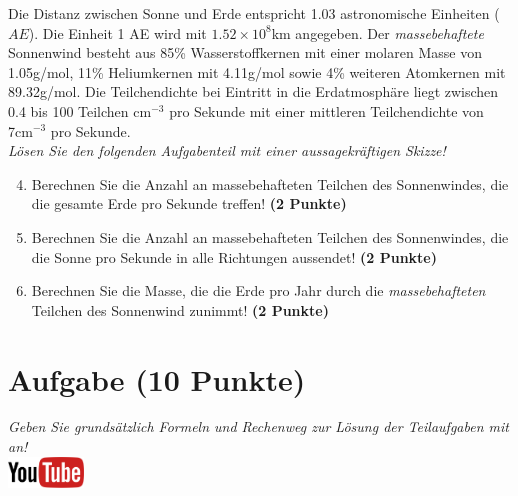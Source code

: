 \documentclass[a4paper, 9pt]{scrartcl}\usepackage[]{graphicx}\usepackage[]{xcolor}
\begin{document}
Die Distanz zwischen Sonne und Erde entspricht 1.03 astronomische Einheiten ($AE$). Die Einheit 1 AE wird mit \ensuremath{1.52\times 10^{8}}km angegeben. Der \textit{massebehaftete} Sonnenwind besteht aus 85\% Wasserstoffkernen mit einer molaren Masse von 1.05g/mol, 11\% Heliumkernen mit 4.11g/mol sowie 4\% weiteren Atomkernen mit  89.32g/mol. Die Teilchendichte bei Eintritt in die Erdatmosphäre liegt zwischen 0.4 bis 100 Teilchen cm$^{-3}$ pro Sekunde mit einer mittleren Teilchendichte von 7cm$^{-3}$ pro Sekunde. \\

\textit{Lösen Sie den folgenden Aufgabenteil mit einer aussagekräftigen Skizze!}

\begin{enumerate}
  \setcounter{enumi}{3}
\item Berechnen Sie die Anzahl an massebehafteten Teilchen des Sonnenwindes, die die gesamte Erde pro Sekunde treffen! \textbf{(2 Punkte)}
\item Berechnen Sie die Anzahl an massebehafteten Teilchen des Sonnenwindes, die die Sonne pro Sekunde in alle Richtungen aussendet! \textbf{(2 Punkte)}
\item Berechnen Sie die Masse, die die Erde pro Jahr durch die \textit{massebehafteten} Teilchen des Sonnenwind zunimmt! \textbf{(2 Punkte)}
\end{enumerate}


\clearpage

\section{Aufgabe \hfill (10 Punkte)}

\textit{Geben Sie grunds{\"a}tzlich Formeln und Rechenweg zur L{\"o}sung der
  Teilaufgaben mit an!} \\[1Ex]

\hfill\href{https://youtu.be/n451XnhtSh4}{\includegraphics[width = 2cm]{img/youtube}} %
\hspace{2Ex}
\end{document}
